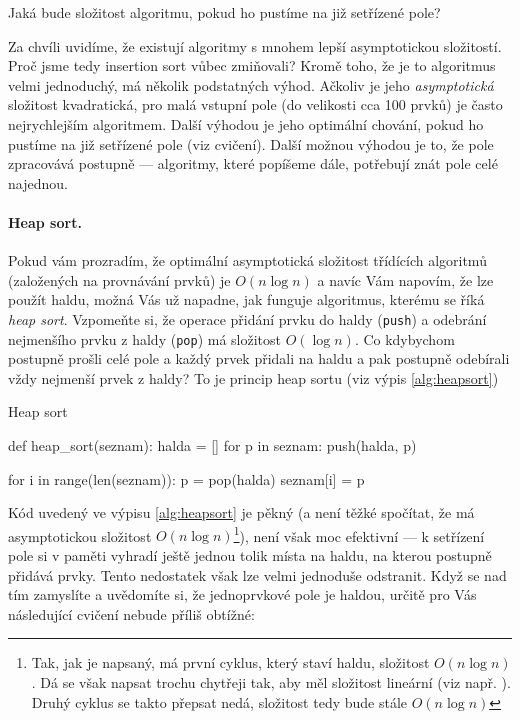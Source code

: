 \begin{cviceni} Jaká bude složitost algoritmu, pokud ho pustíme na již setřízené pole?
\end{cviceni}

Za chvíli uvidíme, že existují algoritmy s mnohem lepší asymptotickou složitostí. Proč jsme tedy insertion sort vůbec zmiňovali? Kromě toho, že
je to algoritmus velmi jednoduchý, má několik podstatných výhod. Ačkoliv je jeho \emph{asymptotická} složitost kvadratická, pro malá vstupní pole
(do velikosti cca 100 prvků) je často nejrychlejším algoritmem. Další výhodou je jeho optimální chování, pokud ho pustíme na již setřízené pole
(viz cvičení). Další možnou výhodou je to, že pole zpracovává postupně --- algoritmy, které popíšeme dále, potřebují znát pole celé najednou.

\paragraph{Heap sort.} Pokud vám prozradím, že optimální asymptotická složitost třídících algoritmů (založených na provnávání prvků) je $O(n\log n)$
a navíc Vám napovím, že lze použít haldu, možná Vás už napadne, jak funguje algoritmus, kterému se říká \emph{heap sort}. Vzpomeňte si, že
operace přidání prvku do haldy ({\tt push}) a odebrání nejmenšího prvku z haldy ({\tt pop}) má složitost $O(\log n)$. Co kdybychom postupně
prošli celé pole a každý prvek přidali na haldu a pak postupně odebírali vždy nejmenší prvek z haldy? To je princip heap sortu (viz výpis \ref{alg:heapsort})

\begin{program}\caption{Heap sort}\label{alg:heapsort}
\begin{python}
def heap_sort(seznam):
  halda = []
  for p in seznam:
    push(halda, p)

  for i in range(len(seznam)):
    p = pop(halda)
    seznam[i] = p
\end{python}
\end{program}

Kód uvedený ve výpisu \ref{alg:heapsort} je pěkný (a není těžké spočítat, že má asymptotickou složitost $O(n\log n)$\footnote{Tak, jak je napsaný, má první cyklus, který staví haldu,
složitost $O(n\log n)$. Dá se však napsat trochu chytřeji tak, aby měl složitost lineární (viz např. \cite{Wirth:1985}). Druhý cyklus se takto
přepsat nedá, složitost tedy bude stále $O(n\log n)$}), není však moc efektivní --- k setřízení pole si
v paměti vyhradí ještě jednou tolik místa na haldu, na kterou postupně přidává prvky. Tento nedostatek však lze velmi jednoduše odstranit.
Když se nad tím zamyslíte a uvědomíte si, že jednoprvkové pole je haldou, určitě pro Vás následující cvičení nebude příliš obtížné:

